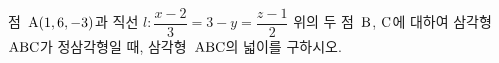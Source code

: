 점~$\mathrm{A}(1{,}\mkern3mu\mathopen{}6{,}\mkern3mu\mathopen{}-3)$과 직선 $l\colon \dfrac{x-2}{3}=3-y=\dfrac{z-1}{2}$ 위의 두 점~$\mathrm{B}$, $\mathrm{C}$에 대하여 삼각형~$\mathrm{ABC}$가 정삼각형일 때, 삼각형~$\mathrm{ABC}$의 넓이를 구하시오.
